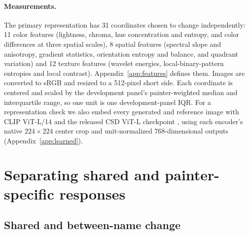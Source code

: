 \documentclass[10pt]{article}
\begin{document}
\paragraph{Measurements.}
The primary representation has 31 coordinates chosen to change independently: 11
color features (lightness, chroma, hue concentration and entropy, and color
differences at three spatial scales), 8 spatial features (spectral slope and
anisotropy, gradient statistics, orientation entropy and balance, and quadrant
variation) and 12 texture features (wavelet energies, local-binary-pattern
entropies and local contrast). Appendix~\ref{app:features} defines them. Images
are converted to sRGB and resized to a 512-pixel short side. Each coordinate is
centered and scaled by the development panel's painter-weighted median and
interquartile range, so one unit is one development-panel IQR. For a
representation check we also embed every generated and reference image with CLIP
ViT-L/14 \citep{radford2021} and the released CSD ViT-L checkpoint
\citep{somepalli2024style}, using each encoder's native $224\times224$ center crop
and unit-normalized 768-dimensional outputs (Appendix~\ref{app:learned}).

\section{Separating shared and painter-specific responses}\label{sec:method}

\subsection{Shared and between-name change}
\end{document}
